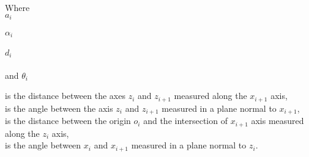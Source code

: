 \begin{minipage}[t]{0.20\textwidth}
Where\\
\hspace*{8mm} $a_i$ \\\\
\hspace*{8mm} $\alpha_i$ \\\\
\hspace*{8mm} $d_i$ \\\\
and \hspace*{0.7mm} $\theta_i$	
\end{minipage}
\begin{minipage}[t]{0.68\textwidth}
\vspace*{2mm}
is the distance between the axes $z_i$ and $z_{i+1}$ measured along the $x_{i+1}$ axis,\\
is the angle between the axis $z_i$ and $z_{i+1}$ measured in a plane normal to $x_{i+1}$,\\
is the distance between the origin $o_i$ and the intersection of $x_{i+1}$ axis measured along the $z_i$ axis,\\
is the angle between $x_i$ and $x_{i+1}$ measured in a plane normal to $z_i$.
\end{minipage}









